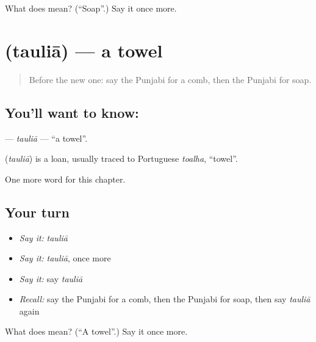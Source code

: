 \begin{tcolorbox}[breakable,colback=teal!4,colframe=teal!35!black,title={Before you move on}]
What does  mean? (\textquotedblleft{}Soap\textquotedblright{}.) Say it once more.
\end{tcolorbox}
\section[\texorpdfstring{\pa{ਤੌਲੀਆ} (tauliā)}{ਤੌਲੀਆ (tauliā)}]{ (tauliā) — a towel}

\label{lesson:PA-C114-taulia}



\begin{quote}
Before the new one: say the Punjabi for a comb, then the Punjabi for soap.
\end{quote}

\subsection*{You'll want to know: }
\textbf{} — \emph{tauliā} — \textquotedblleft{}a towel\textquotedblright{}.

\begin{cousinweb}
\textbf{} (\emph{tauliā}) is a loan, usually traced to Portuguese \emph{toalha}, \textquotedblleft{}towel\textquotedblright{}.
\end{cousinweb}

\begin{grammarlens}[title={What you've built}]
One more word for this chapter.
\end{grammarlens}

\subsection*{Your turn}
\begin{itemize}
\raggedright
  \item \emph{Say it:} \emph{tauliā}
  \item \emph{Say it:} \emph{tauliā}, once more
  \item \emph{Say it:} say \emph{tauliā}
  \item \emph{Recall:} say the Punjabi for a comb, then the Punjabi for soap, then say \emph{tauliā} again
\end{itemize}

\begin{tcolorbox}[breakable,colback=teal!4,colframe=teal!35!black,title={Before you move on}]
What does  mean? (\textquotedblleft{}A towel\textquotedblright{}.) Say it once more.
\end{tcolorbox}
